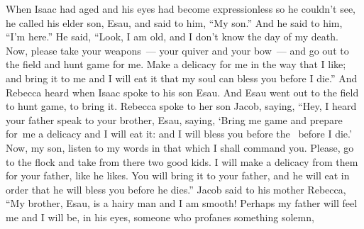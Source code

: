 
\begin{inparaenum}
   When Isaac had aged and his eyes had become expressionless so he couldn't see, he called his elder son, Esau, and said to him, ``My son.'' And he said to him, ``I'm here.''%
   He said, ``Look, I am old, and I don't know the day of my death.%
   Now, please take your weapons~--- your quiver and your bow~--- and go out to the field and hunt game for me.%
   Make a delicacy%
  for me in the way that%
  I like; and bring it to me and I will eat it that my soul can bless you before I die.''%
   And Rebecca heard when Isaac spoke to his son Esau. And Esau went out to the field to hunt game, to bring it.%
   Rebecca spoke to her son Jacob, saying, ``Hey, I heard your father speak to your brother, Esau, saying,%
   `Bring me game and prepare for\understood\ me a delicacy and I will eat it: and I will bless you before the \lord\ before I die.'%
   Now, my son, listen to my words in that which I shall command you.%
   Please, go to the flock and take from there two good kids. I will make a delicacy from them for your father, like he likes.%
   You will bring it to your father, and he will eat in order that he will bless you before he dies.''%
   Jacob said to his mother Rebecca, ``My brother, Esau, is a hairy man and I am smooth!%
   Perhaps my father will feel me and I will be, in his eyes, someone who profanes something solemn,%

\end{inparaenum}
